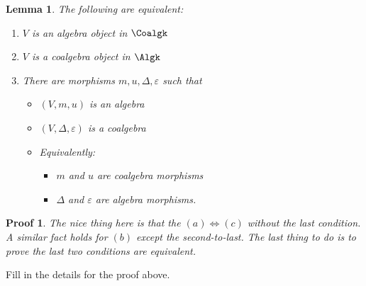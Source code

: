 \documentclass[12pt]{article}
\theoremstyle{break}
\theoremstyle{nonumberbreak}
\theoremstyle{changebreak}
\newtheorem{lem}[thm]{Lemma}
\theoremstyle{break}
\theoremstyle{nonumberbreak}
\newtheorem{prf}{Proof}
\theoremstyle{nonumberplain}
\theoremstyle{change}
\begin{document}
\begin{lem}
	The following are equivalent:
	\begin{enumerate}
		\item $V$ is an algebra object in $\Coalgk$
		\item $V$ is a coalgebra object in $\Algk$
		\item There are morphisms $m,u,\Delta,\varepsilon$ such that
		\begin{itemize}
			\item $(V,m,u)$ is an algebra
			\item $(V,\Delta,\varepsilon)$ is a coalgebra
			\item Equivalently:
			\begin{itemize}
				\item $m$ and $u$ are coalgebra morphisms
				\item $\Delta$ and $\varepsilon$ are algebra morphisms.
			\end{itemize}
		\end{itemize}
	\end{enumerate}
\end{lem}
\begin{prf}
	The nice thing here is that the $(a)\Leftrightarrow (c)$ without the last condition. A similar fact holds
	for $(b)$ except the second-to-last. The last thing to do is to prove the last two conditions are equivalent.
\end{prf}
\begin{prob}
	Fill in the details for the proof above.
\end{prob}
\end{document}
